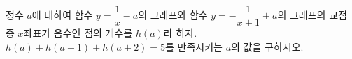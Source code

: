 \hspace*{2mm}\begin{minipage}[t]{\dimexpr\linewidth-2mm\relax}\vspace{0pt}
정수 $a$에 대하여 함수 $y=\dfrac{1}{x}-a$의 그래프와 함수 $y=-\dfrac{1}{x+1}+a$의 그래프의 교점 중 $x$좌표가 음수인 점의 개수를 $h(a)$라 하자. $h(a)+h(a+1)+h(a+2)=5$를 만족시키는 $a$의 값을 구하시오.\end{minipage}
